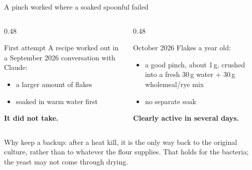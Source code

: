\documentclass[aspectratio=169,11pt]{beamer}
\begin{document}
\begin{frame}{A pinch worked where a soaked spoonful failed \ownresult}
  \begin{columns}[T]
    \begin{column}{0.48\textwidth}
      \begin{block}{First attempt}
        \small
        A recipe worked out in a September 2026 conversation with Claude:
        \begin{itemize}
          \item a larger amount of flakes
          \item soaked in warm water first
        \end{itemize}
        \textbf{It did not take.}
      \end{block}
    \end{column}
    \begin{column}{0.48\textwidth}
      \begin{block}{October 2026}
        \small
        Flakes a year old:
        \begin{itemize}
          \item a good pinch, about 1\,g, crushed into a fresh 30\,g water + 30\,g wholemeal/rye mix
          \item no separate soak
        \end{itemize}
        \textbf{Clearly active in several days.}
      \end{block}
    \end{column}
  \end{columns}
  \medskip
  {\small Why keep a backup: after a heat kill, it is the only way back to the original culture, rather than to whatever the flour supplies. That holds for the bacteria; the yeast may not come through drying.}
\end{frame}
\end{document}
